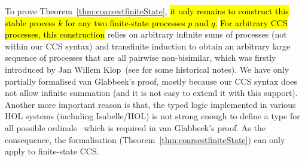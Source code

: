 To prove Theorem~\ref{thm:coarsestfiniteState}, \hl{it only remains to construct this stable
process $k$ for any two finite-state processes $p$ and $q$.}
\hl{For arbitrary CCS processes, this construction} relies on
arbitrary infinite sums of processes (not within our CCS syntax) and
transfinite induction to obtain
an arbitrary large sequence of processes that are all pairwise
non-bisimilar,
which was firstly introduced by Jan
Willem Klop~(see \cite{van2005characterisation} for some historical notes).
We have only partially formalised
van Glabbeek's proof, mostly because our CCS syntax does not allow infinite
summation (and it is not easy to extend it with this support).
Another more important reason is that, the typed logic
implemented in various HOL systems (including Isabelle/HOL) is not
strong enough to define a type for all possible
ordinals~\cite{norrish2013ordinals} which is required in van
Glabbeek's proof. As the consequence, the formalisation
(Theorem~\ref{thm:coarsestfiniteState})
can only apply to finite-state CCS.

